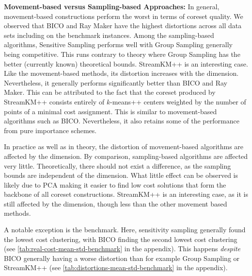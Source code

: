 {\bf Movement-based versus Sampling-based Approaches:}
In general, movement-based constructions perform the worst in terms of coreset quality. 
We observed that BICO and Ray Maker have the highest distortions across all data sets including on the benchmark instances. Among the sampling-based algorithms, Sensitive Sampling performs well with Group Sampling generally being competitive. This runs contrary to theory where Group Sampling has the better (currently known) theoretical bounds. StreamKM++ is an interesting case. Like the movement-based methods, its distortion increases with the dimension. Nevertheless, it generally performs significantly better than BICO and Ray Maker. This can be attributed to the fact that the coreset produced by StreamKM++ consists entirely of $k$-means++ centers weighted by the number of points of a minimal cost assignment. This is similar to movement-based algorithms such as BICO. Nevertheless, it also retains some of the performance from pure importance schemes.

In practice as well as in theory, the distortion of movement-based algorithms are affected by the dimension. By comparison, sampling-based algorithms are affected very little. Theoretically, there should not exist a difference, as the sampling bounds are independent of the dimension. What little effect can be observed is likely due to PCA making it easier to find low cost solutions that form the backbone of all coreset constructions. StreamKM++ is an interesting case, as it is still affected by the dimension, though less than the other movement based methods.

A notable exception is the benchmark. Here, sensitivity sampling generally found the lowest cost clustering, with BICO finding the second lowest cost clustering (see \cref{tab:real-cost-mean-std-benchmark} in the appendix). This happens \emph{despite} BICO generally having a worse distortion than for example Group Sampling or StreamKM++ (see \cref{tab:distortions-mean-std-benchmark} in the appendix).






